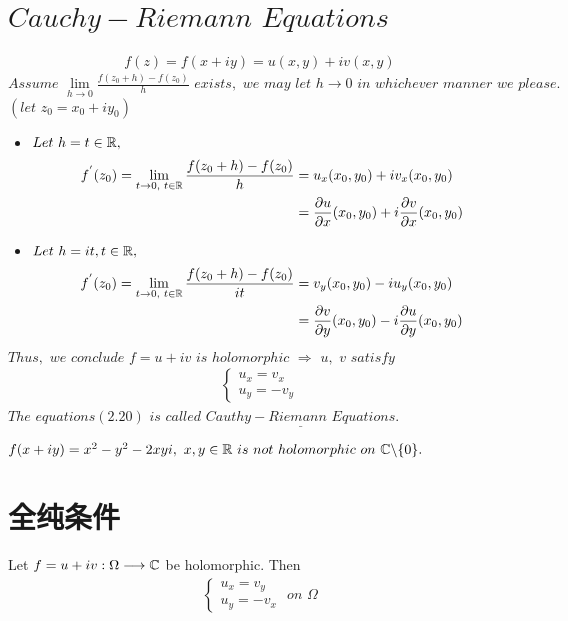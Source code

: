 \section{$Cauchy - Riemann \,\, Equations$}
\begin{align}
	f(z) = f(x + iy) = u(x , y) + iv(x , y)
\end{align}
$Assume \,\, \underset{h \to 0}{\lim}{\frac{f(z_0 + h) - f(z_0)}{h}} \,\, exists , \,\, we \,\, may \,\, let \,\, h \to 0 \,\, in \,\, whichever \,\, manner \,\, we \,\, please. $\\
$(let \,\, z_0 = x_0 + iy_0)$
\begin{itemize}
	\item $Let \,\, h = t \in \mathbb{R} , $
	\begin{align}
		f^{'}(z_0) = \lim_{t \to 0 , \,\, t \in \mathbb{R}}{\frac{f(z_0 + h) - f(z_0)}{h}} &= u_x (x_0 , y_0) + i v_x (x_0 , y_0) \\
		&= \frac{\partial u}{\partial x}(x_0 , y_0) + i\frac{\partial v}{\partial x}(x_0 , y_0)
	\end{align}
	
	\item $Let \,\, h = it , t \in \mathbb{R} ,$
	\begin{align}
		f^{'}(z_0) = \lim_{t \to 0 , \,\, t \in \mathbb{R}}{\frac{f(z_0 + h) - f(z_0)}{it}} &= v_y(x_0 , y_0) - iu_y(x_0 , y_0) \\
		&= \frac{\partial v}{\partial y}(x_0 , y_0) - i\frac{\partial u}{\partial y}(x_0 , y_0)
	\end{align}
\end{itemize}
$Thus , \,\, we \,\, conclude \,\, f = u + iv \,\, is \,\, holomorphic \,\, \Rightarrow \,\, u , \,\, v \,\, satisfy$
\begin{align}
	\begin{cases}
		u_x = v_x\\
		u_y = - v_y
	\end{cases}
\end{align}
$The \,\, equations(2.20) \,\, is \,\, called \,\, \underline{\textbf{$Cauthy - Riemann \,\, Equations$}}$.

\vspace*{2em}
\begin{example}\label{ex 2.3.1}
	$f(x + iy) = x^2 - y^2 - 2xyi , \,\, x , y \in \mathbb{R} \,\, is \,\, not \,\, holomorphic \,\, on \,\, \mathbb{C} \backslash \{ 0 \}.$
\end{example}

\newpage
\section{全纯条件}
Let $f = u + i v : \Omega \longrightarrow \mathbb{C}$ be holomorphic. Then
\begin{align}
	\begin{cases}
		u_x = v_y \\
		u_y = - v_x
	\end{cases} \,\, on \,\, \Omega
\end{align}


